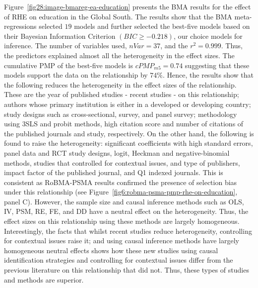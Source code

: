 \documentclass[12pt, english]{article}
\begin{document}
    Figure~\ref{fig28:image-bmareg-ea-education} presents the BMA results for the effect of RHE on education in the Global South. The results show that the BMA meta-regressions selected $19$ models and further selected the best-five models based on their Bayesian Information Criterion $(BIC \geq -0.218)$, our choice models for inference. The number of variables used, $nVar = 37$, and the $r^2 = 0.999$. Thus, the predictors explained almost all the heterogeneity in the effect sizes. The cumulative PMP of the best-five models is $cPMP_{m5} = 0.74$ suggesting that these models support the data on the relationship by $74\%$. Hence, the results show that the following reduces the heterogeneity in the effect sizes of the relationship. These are the year of published studies - recent studies - on this relationship; authors whose primary institution is either in a developed or developing country; study designs such as cross-sectional, survey, and panel survey; methodology using 3SLS and probit methods, high citation score and number of citations of the published journals and study, respectively. On the other hand, the following is found to raise the heterogeneity: significant coefficients with high standard errors, panel data and RCT study designs, logit, Heckman and negative-binomial methods, studies that controlled for contextual issues, and type of publishers, impact factor of the published journal, and Q1 indexed journals. This is consistent as RoBMA-PSMA results confirmed the presence of selection bias under this relationship (see Figure~\ref{fig6:robma-psma-pmp-rhe-on-education}, panel C). However, the sample size and causal inference methods such as OLS, IV, PSM, RE, FE, and DD have a neutral effect on the heterogeneity. Thus, the effect sizes on this relationship using these methods are largely homogeneous. Interestingly, the facts that whilst recent studies reduce heterogeneity, controlling for contextual issues raise it; and using causal inference methods have largely homogeneous neutral effects shows how these new studies using causal identification strategies and controlling for contextual issues differ from the previous literature on this relationship that did not. Thus, these types of studies and methods are superior.
\end{document}
